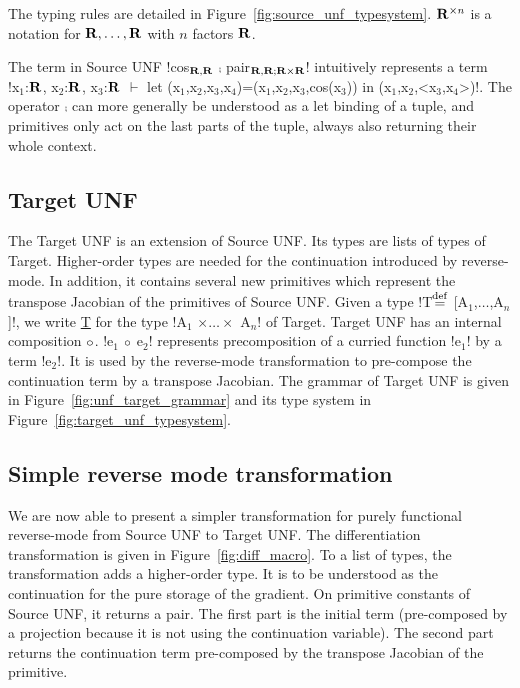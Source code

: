 The typing rules are detailed in Figure~\ref{fig:source_unf_typesystem}.
$\mathbf{R}^{\times n}$ is a notation for $\mathbf{R},\ldots,\mathbf{R}$ with $n$ factors $\mathbf{R}$.



\begin{example}
    The term in Source UNF !cos$_{\mathbf{R},\mathbf{R}}$ $\comp$ pair$_{\mathbf{R},\mathbf{R}; \mathbf{R}\times\mathbf{R}}$! 
    intuitively represents a term \\
    !x$_1$:$\mathbf{R}$, x$_2$:$\mathbf{R}$, x$_3$:$\mathbf{R}$ $\vdash$ let (x$_1$,x$_2$,x$_3$,x$_4$)=(x$_1$,x$_2$,x$_3$,cos(x$_3$)) in (x$_1$,x$_2$,<x$_3$,x$_4$>)!.
    The operator $\comp$ can more generally be understood as a let binding of a tuple, and primitives only act on the last parts of the tuple, always also returning their whole context.
\end{example}

\subsection{Target UNF} %
\label{sub:Target UNF}

The Target UNF is an extension of Source UNF. 
Its types are lists of types of Target. 
Higher-order types are needed for the continuation introduced by reverse-mode. 
In addition, it contains several new primitives which represent the transpose Jacobian of the primitives of Source UNF.
Given a type !T$\stackrel {\mathrm{def}}=$ [A$_1$,$\ldots$,A$_n$]!, we write \underline{T} for the type !A$_1$ $\times\ldots\times$ A$_n$! of Target. 
Target UNF has an internal composition $\circ$. 
!e$_{1}$ $\circ$ e$_{2}$! represents precomposition of a curried function !e$_{1}$! by a term !e$_{2}$!.
It is used by the reverse-mode transformation to pre-compose the continuation term by a transpose Jacobian.
The grammar of Target UNF is given in Figure~\ref{fig:unf_target_grammar} and its type system in Figure~\ref{fig:target_unf_typesystem}.





\subsection{Simple reverse mode transformation} %
\label{sub:Simple reverse mode transformation}

We are now able to present a simpler transformation for purely functional reverse-mode from Source UNF to Target UNF.
The differentiation transformation is given in Figure~\ref{fig:diff_macro}.
To a list of types, the transformation adds a higher-order type. 
It is to be understood as the continuation for the pure storage of the gradient.
On primitive constants of Source UNF, it returns a pair. 
The first part is the initial term (pre-composed by a projection because it is not using the continuation variable).
The second part returns the continuation term pre-composed by the transpose Jacobian of the primitive.

